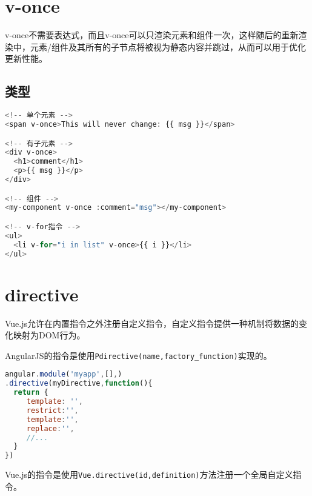 \begin{lstlisting}[language=JavaScript]

\end{lstlisting}




\begin{lstlisting}[language=JavaScript]

\end{lstlisting}




\begin{lstlisting}[language=JavaScript]

\end{lstlisting}

\chapter{v-once}

v-once不需要表达式，而且v-once可以只渲染元素和组件一次，这样随后的重新渲染中，元素/组件及其所有的子节点将被视为静态内容并跳过，从而可以用于优化更新性能。

\section{类型}


\begin{lstlisting}[language=JavaScript]
<!-- 单个元素 -->
<span v-once>This will never change: {{ msg }}</span>

<!-- 有子元素 -->
<div v-once>
  <h1>comment</h1>
  <p>{{ msg }}</p>
</div>

<!-- 组件 -->
<my-component v-once :comment="msg"></my-component>

<!-- v-for指令 -->
<ul>
  <li v-for="i in list" v-once>{{ i }}</li>
</ul>
\end{lstlisting}

\chapter{directive}


Vue.js允许在内置指令之外注册自定义指令，自定义指令提供一种机制将数据的变化映射为DOM行为。


\begin{compactitem}
\item AngularJS的指令是使用\texttt{Pdirective(name,factory\_function)}实现的。



\begin{lstlisting}[language=JavaScript]
angular.module('myapp',[],)
.directive(myDirective,function(){
  return {
     template: '',
     restrict:'',
     template:'',
     replace:'',
     //...
  }
})
\end{lstlisting}

\item Vue.js的指令是使用\texttt{Vue.directive(id,definition)}方法注册一个全局自定义指令。

\end{compactitem}

